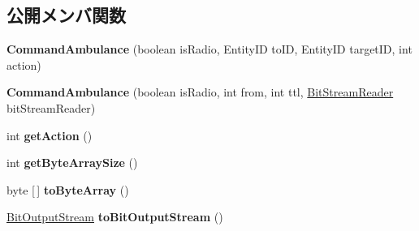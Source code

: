 \subsection*{公開メンバ関数}
\begin{DoxyCompactItemize}
\item 
\hypertarget{classadf_1_1agent_1_1communication_1_1standard_1_1bundle_1_1topdown_1_1CommandAmbulance_ad1a27204ff06b816f7ae46e878a5f06d}{}\label{classadf_1_1agent_1_1communication_1_1standard_1_1bundle_1_1topdown_1_1CommandAmbulance_ad1a27204ff06b816f7ae46e878a5f06d} 
{\bfseries Command\+Ambulance} (boolean is\+Radio, Entity\+ID to\+ID, Entity\+ID target\+ID, int action)
\item 
\hypertarget{classadf_1_1agent_1_1communication_1_1standard_1_1bundle_1_1topdown_1_1CommandAmbulance_a2f2920c0847d04bf2436ce93ab97b426}{}\label{classadf_1_1agent_1_1communication_1_1standard_1_1bundle_1_1topdown_1_1CommandAmbulance_a2f2920c0847d04bf2436ce93ab97b426} 
{\bfseries Command\+Ambulance} (boolean is\+Radio, int from, int ttl, \hyperlink{classadf_1_1component_1_1communication_1_1util_1_1BitStreamReader}{Bit\+Stream\+Reader} bit\+Stream\+Reader)
\item 
\hypertarget{classadf_1_1agent_1_1communication_1_1standard_1_1bundle_1_1topdown_1_1CommandAmbulance_a4798a6f63734c218d74123081fd3cdd3}{}\label{classadf_1_1agent_1_1communication_1_1standard_1_1bundle_1_1topdown_1_1CommandAmbulance_a4798a6f63734c218d74123081fd3cdd3} 
int {\bfseries get\+Action} ()
\item 
\hypertarget{classadf_1_1agent_1_1communication_1_1standard_1_1bundle_1_1topdown_1_1CommandAmbulance_a9875366e4a9fc0dffabc39d3432156b8}{}\label{classadf_1_1agent_1_1communication_1_1standard_1_1bundle_1_1topdown_1_1CommandAmbulance_a9875366e4a9fc0dffabc39d3432156b8} 
int {\bfseries get\+Byte\+Array\+Size} ()
\item 
\hypertarget{classadf_1_1agent_1_1communication_1_1standard_1_1bundle_1_1topdown_1_1CommandAmbulance_ad75c6f60cf0e1399076151080a2a145f}{}\label{classadf_1_1agent_1_1communication_1_1standard_1_1bundle_1_1topdown_1_1CommandAmbulance_ad75c6f60cf0e1399076151080a2a145f} 
byte \mbox{[}$\,$\mbox{]} {\bfseries to\+Byte\+Array} ()
\item 
\hypertarget{classadf_1_1agent_1_1communication_1_1standard_1_1bundle_1_1topdown_1_1CommandAmbulance_a737adfba5890836b96f169ad0b27acd7}{}\label{classadf_1_1agent_1_1communication_1_1standard_1_1bundle_1_1topdown_1_1CommandAmbulance_a737adfba5890836b96f169ad0b27acd7} 
\hyperlink{classadf_1_1component_1_1communication_1_1util_1_1BitOutputStream}{Bit\+Output\+Stream} {\bfseries to\+Bit\+Output\+Stream} ()

\end{DoxyCompactItemize}

